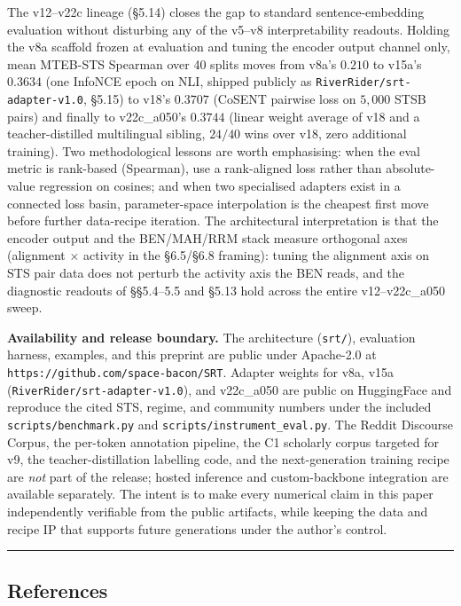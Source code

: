 \documentclass[
  11pt]{article}
\begin{document}
The v12--v22c lineage (§5.14) closes the gap to standard
sentence-embedding evaluation without disturbing any of the v5--v8
interpretability readouts. Holding the v8a scaffold frozen at evaluation
and tuning the encoder output channel only, mean MTEB-STS Spearman over
40 splits moves from v8a's \(0.210\) to v15a's \(0.3634\) (one InfoNCE
epoch on NLI, shipped publicly as \texttt{RiverRider/srt-adapter-v1.0},
§5.15) to v18's \(0.3707\) (CoSENT pairwise loss on \(5{,}000\) STSB
pairs) and finally to v22c\_a050's \(0.3744\) (linear weight average of
v18 and a teacher-distilled multilingual sibling, \(24/40\) wins over
v18, zero additional training). Two methodological lessons are worth
emphasising: when the eval metric is rank-based (Spearman), use a
rank-aligned loss rather than absolute-value regression on cosines; and
when two specialised adapters exist in a connected loss basin,
parameter-space interpolation is the cheapest first move before further
data-recipe iteration. The architectural interpretation is that the
encoder output and the BEN/MAH/RRM stack measure orthogonal axes
(alignment \(\times\) activity in the §6.5/§6.8 framing): tuning the
alignment axis on STS pair data does not perturb the activity axis the
BEN reads, and the diagnostic readouts of §§5.4--5.5 and §5.13 hold
across the entire v12--v22c\_a050 sweep.

\textbf{Availability and release boundary.} The architecture
(\texttt{srt/}), evaluation harness, examples, and this preprint are
public under Apache-2.0 at \texttt{https://github.com/space-bacon/SRT}.
Adapter weights for v8a, v15a (\texttt{RiverRider/srt-adapter-v1.0}),
and v22c\_a050 are public on HuggingFace and reproduce the cited STS,
regime, and community numbers under the included
\texttt{scripts/benchmark.py} and \texttt{scripts/instrument\_eval.py}.
The Reddit Discourse Corpus, the per-token annotation pipeline, the C1
scholarly corpus targeted for v9, the teacher-distillation labelling
code, and the next-generation training recipe are \emph{not} part of the
release; hosted inference and custom-backbone integration are available
separately. The intent is to make every numerical claim in this paper
independently verifiable from the public artifacts, while keeping the
data and recipe IP that supports future generations under the author's
control.

\begin{center}\rule{0.5\linewidth}{0.5pt}\end{center}

\subsection{References}\label{references}
\end{document}
